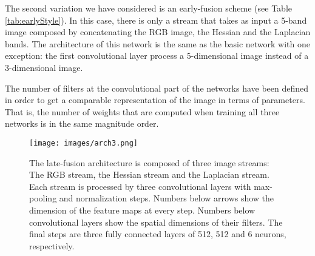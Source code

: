 \documentclass[review,12pt,3p]{elsarticle}
\begin{document}
The second variation we have considered is an early-fusion scheme (see Table \ref{tab:earlyStyle}). In this case, there is only a stream that takes as input a 5-band image composed by concatenating the RGB image, the Hessian and the Laplacian bands. The architecture of this network is the same as the basic network with one exception: the first convolutional layer process a 5-dimensional image instead of a 3-dimensional image.

The number of filters at the convolutional part of the networks have been defined in order to get a comparable representation of the image in terms of parameters. That is, the number of weights that are computed when training all three networks is in the same magnitude order.


\begin{figure*}
\centering
\texttt{[image: images/arch3.png]}
\caption{The late-fusion architecture is composed of three image streams: The RGB stream, the Hessian stream and the Laplacian stream. Each stream is processed by three convolutional layers with max-pooling and normalization steps. Numbers below arrows show the dimension of the feature maps at every step. Numbers below convolutional layers show the spatial dimensions of their filters. The final steps are three fully connected layers of 512, 512 and 6 neurons, respectively. }
\label{fig:CNN_Architecture}
\end{figure*}
\end{document}
